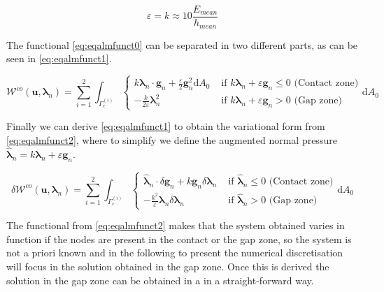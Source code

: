 \documentclass[a4paper,10pt]{article} %
\begin{document}
\begin{equation}\label{eq:eqcoeff}
 \varepsilon = k \approx 10 \frac{E_{mean}}{h_{mean}}
\end{equation}

The functional \eqref{eq:eqalmfunct0} can be separated in two different parts, as can be seen in \eqref{eq:eqalmfunct1}.

\begin{equation}\label{eq:eqalmfunct1}
  \mathcal{W}^{co}(\mathbf{u},\boldsymbol{\lambda}_n) = \sum_{i = 1}^2 \int_{\Gamma_c^{(i)}} \begin{cases}  k \boldsymbol{\lambda}_n \cdot \mathbf{g}_n  + \frac{\varepsilon}{2} \mathbf{g}_n^2 \text{d}A_0 & \text{ if } k\boldsymbol{\lambda}_n +\varepsilon \mathbf{g}_n \leq 0 \text{ (Contact zone)} \\ - \frac{k}{2\varepsilon} \boldsymbol{\lambda}_n^2   & \text{ if } k\boldsymbol{\lambda}_n +\varepsilon \mathbf{g}_n > 0 \text{ (Gap zone)} \end{cases}\text{d}A_0 
\end{equation}

Finally we can derive \eqref{eq:eqalmfunct1} to obtain the variational form from \eqref{eq:eqalmfunct2}, where to simplify we define the augmented normal pressure $\hat{\boldsymbol{\lambda}}_{n} = k\boldsymbol{\lambda}_n +\varepsilon \mathbf{g}_n $.

\begin{equation}\label{eq:eqalmfunct2}
  \delta \mathcal{W}^{co}(\mathbf{u},\boldsymbol{\lambda}_n) = \sum_{i = 1}^2 \int_{\Gamma_c^{(i)}}\begin{cases}  \hat{\boldsymbol{\lambda}}_{n} \cdot \delta\mathbf{g}_n + k \mathbf{g}_n \delta\boldsymbol{\lambda}_n & \text{ if } \hat{\boldsymbol{\lambda}}_{n} \leq 0 \text{ (Contact zone)} \\  - \frac{k^2}{\varepsilon} \boldsymbol{\lambda}_n \delta\boldsymbol{\lambda}_n & \text{ if } \hat{\boldsymbol{\lambda}}_{n} > 0 \text{ (Gap zone)} \end{cases} \text{d}A_0 
\end{equation}

The functional from \eqref{eq:eqalmfunct2} makes that the system obtained varies in function if the nodes are present in the contact or the gap zone, so the system is not a priori known and in the following to present the numerical discretisation will focus in the solution obtained in the gap zone. Once this is derived the solution in the gap zone can be obtained in a in a straight-forward way.
\end{document}
